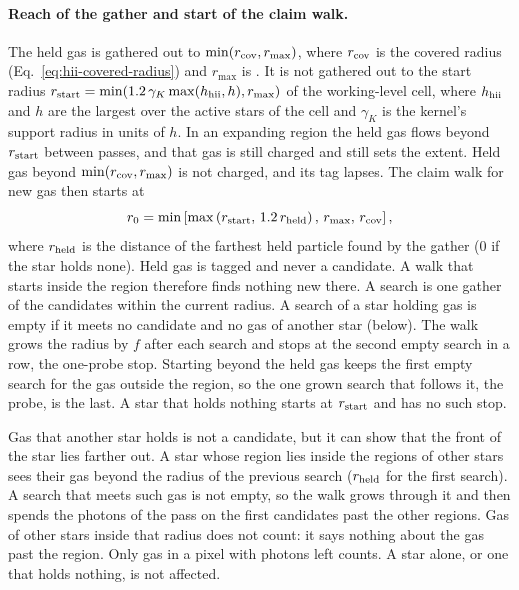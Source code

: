 \paragraph{Reach of the gather and start of the claim walk.}\label{sec:hii-claim-start} The held gas is
gathered out to $\min(r_{\rm cov}, r_{\max})$, where $r_{\rm cov}$ is the
covered radius (Eq.~\eqref{eq:hii-covered-radius}) and $r_{\max}$ is
. It is not gathered out to the start
radius $r_{\rm start} = \min(1.2\,\gamma_K \max(h_{\rm hii}, h), r_{\max})$ of
the working-level cell, where $h_{\rm hii}$ and $h$ are the largest over the
active stars of the cell and $\gamma_K$ is the kernel's support radius in
units of $h$. In an expanding region the held gas flows beyond
$r_{\rm start}$ between passes, and that gas is still charged and still sets
the extent. Held gas beyond $\min(r_{\rm cov}, r_{\max})$ is not charged, and
its tag lapses. The claim walk for new gas then starts at
\begin{equation}
  r_0 = \min\left[\max\left(r_{\rm start},\, 1.2\, r_{\rm held}\right),\,
        r_{\max},\, r_{\rm cov}\right],
  \label{eq:hii-claim-start}
\end{equation}
where $r_{\rm held}$ is the distance of the farthest held particle found by
the gather (0 if the star holds none). Held gas is tagged and never a
candidate. A walk that starts inside the region therefore finds nothing new
there. A search is one gather of the candidates within the current radius. A
search of a star holding gas is empty if it meets no candidate and no gas of
another star (below). The walk grows the radius by
 $f$ after each search and stops at
the second empty search in a row, the one-probe stop. Starting beyond the held
gas keeps the first empty search for the gas outside the region, so the one
grown search that follows it, the probe, is the last. A star that holds nothing
starts at $r_{\rm start}$ and has no such stop.

Gas that another star holds is not a candidate, but it can show that the front
of the star lies farther out. A star whose region lies inside the regions of
other stars sees their gas beyond the radius of the previous search
($r_{\rm held}$ for the first search). A search that meets such gas is not
empty, so the walk grows through it and then spends the photons of the pass on
the first candidates past the other regions. Gas of other stars inside that
radius does not count: it says nothing about the gas past the region. Only gas
in a pixel with photons left counts. A star alone, or one that holds nothing,
is not affected.

